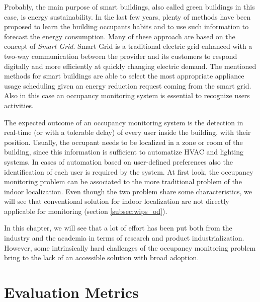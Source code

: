 \smallskip
Probably, the main purpose of smart buildings, also called green buildings in this case, is energy sustainability.
In the last few years, plenty of methods have been proposed to learn the building occupants habits and to use such information to forecast the energy consumption.
Many of these approach are based on the concept of \emph{Smart Grid}. Smart Grid is a traditional electric grid enhanced with a two-way communication between the provider and its customers to respond digitally and more efficiently at quickly changing electric demand.
The mentioned methods for smart buildings are able to select the most appropriate appliance usage scheduling given an energy reduction request coming from the smart grid. Also in this case an occupancy monitoring system is essential to recognize users activities.

\medskip
The expected outcome of an occupancy monitoring system is the detection in real-time (or with a tolerable delay) of every user inside the building, with their position. Usually, the occupant needs to be localized in a zone or room of the building, since this information is sufficient to automatize HVAC and lighting systems. In cases of automation based on user-defined preferences also the identification of each user is required by the system.
At first look, the occupancy monitoring problem can be associated to the more traditional problem of the indoor localization. Even though the two problem share some characteristics, we will see that conventional solution for indoor localization are not directly applicable for monitoring (section \ref{subsec:wips_od}).

\smallskip
In this chapter, we will see that a lot of effort has been put both from the industry and the academia in terms of research and product industrialization. However, some intrinsically hard challenges of the occupancy monitoring problem bring to the lack of an accessible solution with broad adoption.


\section{Evaluation Metrics}
\label{sec:occupancy-metrics}

